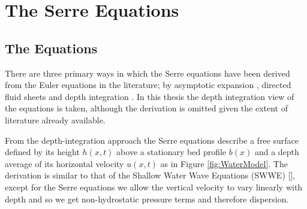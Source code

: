 
\chapter{The Serre Equations}
\label{chp:Serreeqns}









\section{The Equations}
There are three primary ways in which the Serre equations have been derived from the Euler equations in the literature; by asymptotic expansion \cite{Serre-F-1953-857,Bonneton-Lannes-2009-16601}, directed fluid sheets \cite{Green-Naghdi-1976-237} and depth integration \cite{Su-Gardener-1969-536,Zoppou-2014}. In this thesis the depth integration view of the equations is taken, although the derivation is omitted given the extent of literature already available. 

From the depth-integration approach the Serre equations describe a free surface defined by its height $h(x,t)$ above a stationary bed profile $b(x)$ and a depth average of its horizontal velocity $u(x,t)$ as in Figure \ref{fig:WaterModel}. The derivation is similar to that of the Shallow Water Wave Equations (SWWE) [], except for the Serre equations we allow the vertical velocity to vary linearly with depth and so we get non-hydrostatic pressure terms and therefore dispersion.

